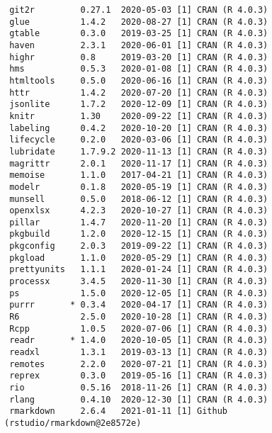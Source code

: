 \documentclass[twoside,12pt,final]{ucthesis-CA2012}
\begin{document}
\begin{ucmainmatter}
\begin{verbatim}
 git2r         0.27.1  2020-05-03 [1] CRAN (R 4.0.3)                       
 glue          1.4.2   2020-08-27 [1] CRAN (R 4.0.3)                       
 gtable        0.3.0   2019-03-25 [1] CRAN (R 4.0.3)                       
 haven         2.3.1   2020-06-01 [1] CRAN (R 4.0.3)                       
 highr         0.8     2019-03-20 [1] CRAN (R 4.0.3)                       
 hms           0.5.3   2020-01-08 [1] CRAN (R 4.0.3)                       
 htmltools     0.5.0   2020-06-16 [1] CRAN (R 4.0.3)                       
 httr          1.4.2   2020-07-20 [1] CRAN (R 4.0.3)                       
 jsonlite      1.7.2   2020-12-09 [1] CRAN (R 4.0.3)                       
 knitr         1.30    2020-09-22 [1] CRAN (R 4.0.3)                       
 labeling      0.4.2   2020-10-20 [1] CRAN (R 4.0.3)                       
 lifecycle     0.2.0   2020-03-06 [1] CRAN (R 4.0.3)                       
 lubridate     1.7.9.2 2020-11-13 [1] CRAN (R 4.0.3)                       
 magrittr      2.0.1   2020-11-17 [1] CRAN (R 4.0.3)                       
 memoise       1.1.0   2017-04-21 [1] CRAN (R 4.0.3)                       
 modelr        0.1.8   2020-05-19 [1] CRAN (R 4.0.3)                       
 munsell       0.5.0   2018-06-12 [1] CRAN (R 4.0.3)                       
 openxlsx      4.2.3   2020-10-27 [1] CRAN (R 4.0.3)                       
 pillar        1.4.7   2020-11-20 [1] CRAN (R 4.0.3)                       
 pkgbuild      1.2.0   2020-12-15 [1] CRAN (R 4.0.3)                       
 pkgconfig     2.0.3   2019-09-22 [1] CRAN (R 4.0.3)                       
 pkgload       1.1.0   2020-05-29 [1] CRAN (R 4.0.3)                       
 prettyunits   1.1.1   2020-01-24 [1] CRAN (R 4.0.3)                       
 processx      3.4.5   2020-11-30 [1] CRAN (R 4.0.3)                       
 ps            1.5.0   2020-12-05 [1] CRAN (R 4.0.3)                       
 purrr       * 0.3.4   2020-04-17 [1] CRAN (R 4.0.3)                       
 R6            2.5.0   2020-10-28 [1] CRAN (R 4.0.3)                       
 Rcpp          1.0.5   2020-07-06 [1] CRAN (R 4.0.3)                       
 readr       * 1.4.0   2020-10-05 [1] CRAN (R 4.0.3)                       
 readxl        1.3.1   2019-03-13 [1] CRAN (R 4.0.3)                       
 remotes       2.2.0   2020-07-21 [1] CRAN (R 4.0.3)                       
 reprex        0.3.0   2019-05-16 [1] CRAN (R 4.0.3)                       
 rio           0.5.16  2018-11-26 [1] CRAN (R 4.0.3)                       
 rlang         0.4.10  2020-12-30 [1] CRAN (R 4.0.3)                       
 rmarkdown     2.6.4   2021-01-11 [1] Github (rstudio/rmarkdown@2e8572e)   

\end{verbatim}
\end{ucmainmatter}
\end{document}
